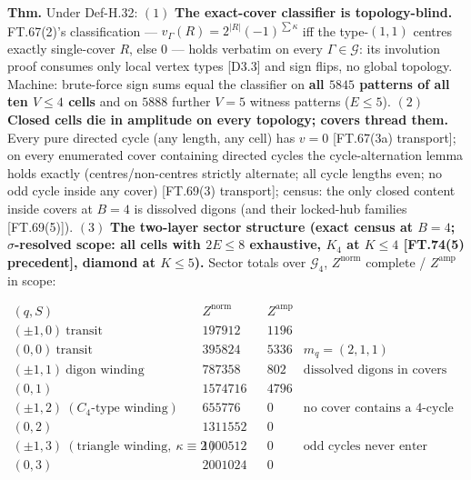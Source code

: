 \begin{theorem}\label{tag:FT-106}
\textbf{Thm.} Under Def-H.32: $(1)$ \textbf{The exact-cover classifier is topology-blind.} FT.67(2)'s classification — $v_\Gamma(R)=2^{|R|}(-1)^{\sum\kappa}$ iff the type-$(1,1)$ centres exactly single-cover $R$, else $0$ — holds verbatim on every $\Gamma\in\mathcal G$: its involution proof consumes only local vertex types [D3.3] and sign flips, no global topology. Machine: brute-force sign sums equal the classifier on \textbf{all $5845$ patterns of all ten $V\le4$ cells} and on $5888$ further $V{=}5$ witness patterns ($E\le5$). $(2)$ \textbf{Closed cells die in amplitude on every topology; covers thread them.} Every pure directed cycle (any length, any cell) has $v=0$ [FT.67(3a) transport]; on every enumerated cover containing directed cycles the cycle-alternation lemma holds exactly (centres/non-centres strictly alternate; all cycle lengths even; no odd cycle inside any cover) [FT.69(3) transport]; census: the only closed content inside covers at $B=4$ is dissolved digons (and their locked-hub families [FT.69(5)]). $(3)$ \textbf{The two-layer sector structure (exact census at $B=4$; $\sigma$-resolved scope: all cells with $2E\le8$ exhaustive, $K_4$ at $K\le4$ [FT.74(5) precedent], diamond at $K\le5$).} Sector totals over $\mathcal G_4$, $Z^{\mathrm{norm}}$ complete / $Z^{\mathrm{amp}}$ in scope:

\[
\begin{array}{c|cc|cc}
(q,S)&Z^{\mathrm{norm}}&&Z^{\mathrm{amp}}&\\ \hline
(\pm1,0)\ \text{transit}&197912&&1196&\\
(0,0)\ \text{transit}&395824&&5336&m_q=(2,1,1)\\
(\pm1,1)\ \text{digon winding}&787358&&802&\text{dissolved digons in covers}\\
(0,1)&1574716&&4796&\\
(\pm1,2)\ (C_4\text{-type winding})&655776&&0&\text{no cover contains a 4-cycle [FT.69(3)(v)]}\\
(0,2)&1311552&&0&\\
(\pm1,3)\ (\text{triangle winding},\ \kappa\equiv2)&1000512&&0&\text{odd cycles never enter covers [FT.69(3)(iv)]}\\
(0,3)&2001024&&0&
\end{array}
\]


\end{theorem}
